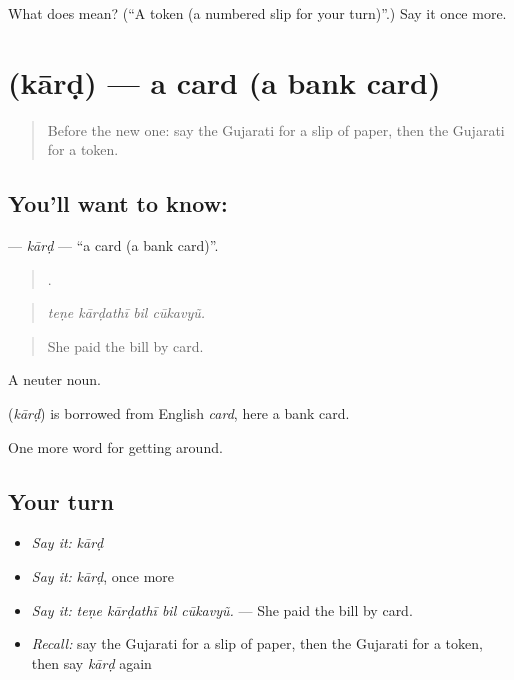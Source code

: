 \begin{tcolorbox}[breakable,colback=teal!4,colframe=teal!35!black,title={Before you move on}]
What does  mean? (\textquotedblleft{}A token (a numbered slip for your turn)\textquotedblright{}.) Say it once more.
\end{tcolorbox}
\section[\texorpdfstring{\gu{કાર્ડ} (kārḍ)}{કાર્ડ (kārḍ)}]{ (kārḍ) — a card (a bank card)}

\label{lesson:GU-C424-kard}



\begin{quote}
Before the new one: say the Gujarati for a slip of paper, then the Gujarati for a token.
\end{quote}

\subsection*{You'll want to know: }
\textbf{} — \emph{kārḍ} — \textquotedblleft{}a card (a bank card)\textquotedblright{}.

\begin{quote}
   .
\end{quote}

\begin{quote}
\emph{teṇe kārḍathī bil cūkavyũ.}
\end{quote}

\begin{quote}
She paid the bill by card.
\end{quote}

A neuter noun.

\begin{cousinweb}
\textbf{} (\emph{kārḍ}) is borrowed from English \emph{card}, here a bank card.
\end{cousinweb}

\begin{grammarlens}[title={What you've built}]
One more word for getting around.
\end{grammarlens}

\subsection*{Your turn}
\begin{itemize}
\raggedright
  \item \emph{Say it:} \emph{kārḍ}
  \item \emph{Say it:} \emph{kārḍ}, once more
  \item \emph{Say it:} \emph{teṇe kārḍathī bil cūkavyũ.} — She paid the bill by card.
  \item \emph{Recall:} say the Gujarati for a slip of paper, then the Gujarati for a token, then say \emph{kārḍ} again
\end{itemize}

